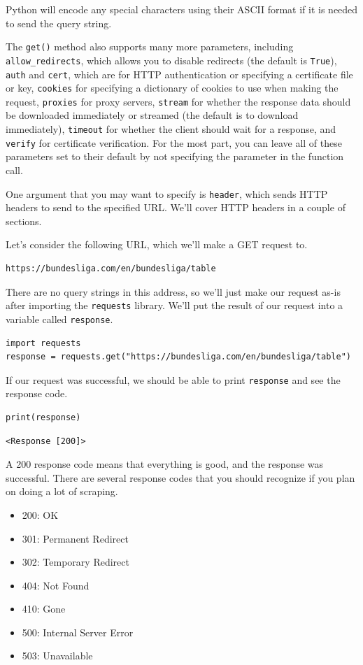 Python will encode any special characters using their ASCII format if it is needed to send the query string.\par
The \verb|get()| method also supports many more parameters, including \\\verb|allow_redirects|, which allows you to disable redirects (the default is \verb|True|), \verb|auth| and \verb|cert|, which are for HTTP authentication or specifying a certificate file or key, \verb|cookies| for specifying a dictionary of cookies to use when making the request, \verb|proxies| for proxy servers, \verb|stream| for whether the response data should be downloaded immediately or streamed (the default is to download immediately), \verb|timeout| for whether the client should wait for a response, and \verb|verify| for certificate verification. For the most part, you can leave all of these parameters set to their default by not specifying the parameter in the function call.\par
One argument that you may want to specify is \verb|header|, which sends HTTP headers to send to the specified URL. We'll cover HTTP headers in a couple of sections.\par
Let's consider the following URL, which we'll make a GET request to.\par
\begin{lstlisting}[style=none]
https://bundesliga.com/en/bundesliga/table
\end{lstlisting}
There are no query strings in this address, so we'll just make our request as-is after importing the \verb|requests| library. We'll put the result of our request into a variable called \verb|response|.
\begin{lstlisting}[style=pippython]
import requests
response = requests.get("https://bundesliga.com/en/bundesliga/table")
\end{lstlisting}
If our request was successful, we should be able to print \verb|response| and see the response code.
\begin{lstlisting}[style=pippython]
print(response)
\end{lstlisting}
\begin{lstlisting}[style=none]
<Response [200]>
\end{lstlisting}
A 200 response code means that everything is good, and the response was successful. There are several response codes that you should recognize if you plan on doing a lot of scraping.\par
\begin{itemize}
	\item 200: OK
	\item 301: Permanent Redirect
	\item 302: Temporary Redirect
	\item 404: Not Found
	\item 410: Gone
	\item 500: Internal Server Error
	\item 503: Unavailable
\end{itemize}

